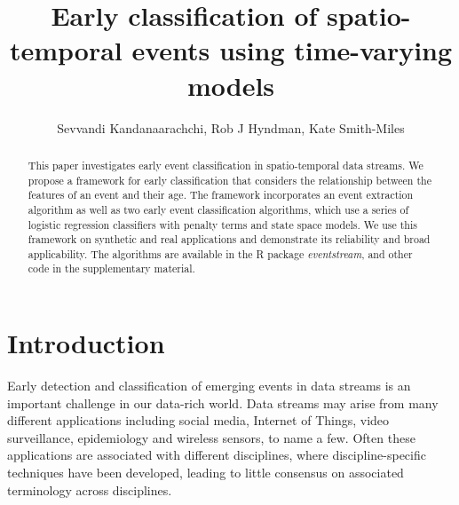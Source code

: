 \documentclass[a4paper,11pt]{article}
\begin{document}

\title{Early classification of spatio-temporal events using time-varying models}
\author{Sevvandi Kandanaarachchi, Rob J Hyndman, Kate Smith-Miles}
\maketitle

\begin{abstract}
This paper investigates early event classification in spatio-temporal data streams. We propose a framework for early classification that considers the relationship between the features of an event and their age. The framework incorporates an event extraction algorithm as well as two early event classification algorithms, which use a series of logistic regression classifiers with penalty terms and state space models. We use this framework on synthetic and real applications and demonstrate its reliability and broad applicability. The algorithms are available in the R package \textit{eventstream}, and other code in the supplementary material.
\end{abstract}



\section{Introduction}

Early detection and classification of emerging events in data streams is an important challenge in our data-rich world. Data streams may arise from many different applications including social media, Internet of Things, video surveillance, epidemiology and wireless sensors, to name a few. Often these applications are associated with different disciplines, where discipline-specific techniques have been developed, leading to little consensus on associated terminology across disciplines.
\end{document}
